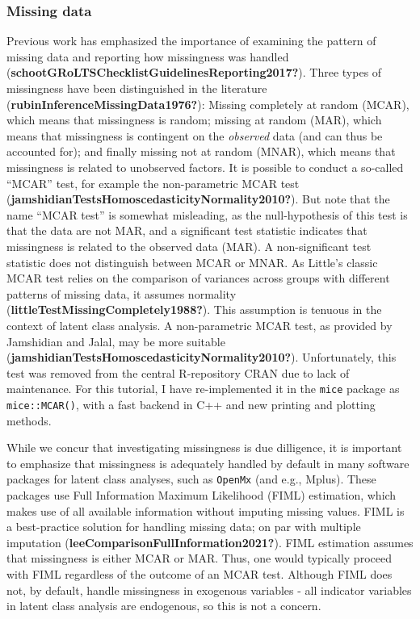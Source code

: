 \documentclass[
  ,man]{apa6}
\begin{document}
\hypertarget{missing-data}{%
\subsubsection{Missing data}\label{missing-data}}

Previous work has emphasized the importance of examining the pattern of missing data and reporting how missingness was handled (\textbf{schootGRoLTSChecklistGuidelinesReporting2017?}).
Three types of missingness have been distinguished in the literature (\textbf{rubinInferenceMissingData1976?}):
Missing completely at random (MCAR), which means that missingness is random;
missing at random (MAR), which means that missingness is contingent on the \emph{observed} data (and can thus be accounted for);
and finally missing not at random (MNAR), which means that missingness is related to unobserved factors.
It is possible to conduct a so-called ``MCAR'' test,
for example the non-parametric MCAR test (\textbf{jamshidianTestsHomoscedasticityNormality2010?}).
But note that the name ``MCAR test'' is somewhat misleading,
as the null-hypothesis of this test is that the data are not MAR,
and a significant test statistic indicates that missingness is related to the observed data (MAR).
A non-significant test statistic does not distinguish between MCAR or MNAR.
As Little's classic MCAR test relies on the comparison of variances across groups with different patterns of missing data, it assumes normality (\textbf{littleTestMissingCompletely1988?}).
This assumption is tenuous in the context of latent class analysis.
A non-parametric MCAR test, as provided by Jamshidian and Jalal, may be more suitable (\textbf{jamshidianTestsHomoscedasticityNormality2010?}).
Unfortunately, this test was removed from the central R-repository CRAN due to lack of maintenance.
For this tutorial, I have re-implemented it in the \texttt{mice} package as \texttt{mice::MCAR()},
with a fast backend in C++ and new printing and plotting methods.

While we concur that investigating missingness is due dilligence,
it is important to emphasize that missingness is adequately handled by default in many software packages for latent class analyses, such as \texttt{OpenMx} (and e.g., Mplus).
These packages use Full Information Maximum Likelihood (FIML) estimation,
which makes use of all available information without imputing missing values.
FIML is a best-practice solution for handling missing data; on par with multiple imputation (\textbf{leeComparisonFullInformation2021?}).
FIML estimation assumes that missingness is either MCAR or MAR.
Thus, one would typically proceed with FIML regardless of the outcome of an MCAR test.
Although FIML does not, by default, handle missingness in exogenous variables - all indicator variables in latent class analysis are endogenous, so this is not a concern.
\end{document}
